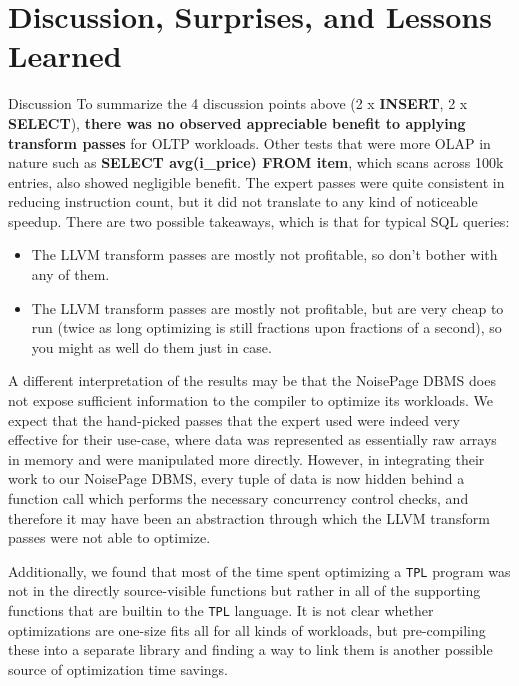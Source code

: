 \documentclass{vldb}
\newcommand{\tpl}{\texttt{TPL}\xspace}
\newcommand{\dbCode}[1]{{\sffamily\small \textbf{#1}}\xspace}
\begin{document}

\section{Discussion, Surprises, and Lessons Learned}

Discussion To summarize the 4 discussion points above (2 x \dbCode{INSERT}, 2 x \dbCode{SELECT}), \textbf{there was no observed appreciable benefit to applying transform passes} for OLTP workloads. Other tests that were more OLAP in nature such as \dbCode{SELECT avg(i\_price) FROM item}, which scans across 100k entries, also showed negligible benefit. The expert passes were quite consistent in reducing instruction count, but it did not translate to any kind of noticeable speedup. There are two possible takeaways, which is that for typical SQL queries:
\begin{itemize}
    \item The LLVM transform passes are mostly not profitable, so don't bother with any of them.
    \item The LLVM transform passes are mostly not profitable, but are very cheap to run (twice as long optimizing is still fractions upon fractions of a second), so you might as well do them just in case.
\end{itemize}

A different interpretation of the results may be that the NoisePage DBMS does not expose sufficient information to the compiler to optimize its workloads. We expect that the hand-picked passes that the expert used were indeed very effective for their use-case, where data was represented as essentially raw arrays in memory and were manipulated more directly. However, in integrating their work to our NoisePage DBMS, every tuple of data is now hidden behind a function call which performs the necessary concurrency control checks, and therefore it may have been an abstraction through which the LLVM transform passes were not able to optimize.

Additionally, we found that most of the time spent optimizing a \tpl program was not in the directly source-visible functions but rather in all of the supporting functions that are builtin to the \tpl language. It is not clear whether optimizations are one-size fits all for all kinds of workloads, but pre-compiling these into a separate library and finding a way to link them is another possible source of optimization time savings.
\end{document}
